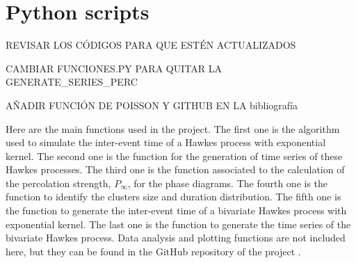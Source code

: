 \chapter{Python scripts}\label{ch:Anexo}
\begin{Large}
    REVISAR LOS CÓDIGOS PARA QUE ESTÉN ACTUALIZADOS

    CAMBIAR FUNCIONES.PY PARA QUITAR LA GENERATE\_SERIES\_PERC

    AÑADIR FUNCIÓN DE POISSON Y GITHUB EN LA bibliografía
\end{Large}
Here are the main functions used in the project. The first one is the algorithm used to simulate the inter-event time of a Hawkes process with exponential kernel. 
The second one is the function for the generation of time series of these Hawkes processes. The third one is the function associated to the calculation of the percolation strength, $P_\infty$,
for the phase diagrams. The fourth one is the function to identify the clusters size and duration distribution. The fifth one is the function to generate the inter-event time of a 
bivariate Hawkes process with exponential kernel. The last one is the function to generate the time series of the bivariate Hawkes process. Data analysis and plotting functions are not included
here, but they can be found in the GitHub repository of the project \cite{github}.



